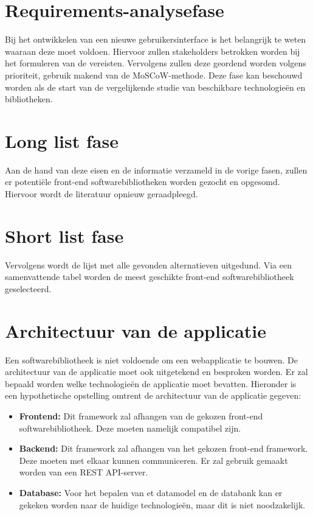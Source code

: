 \section{Requirements-analysefase}
Bij het ontwikkelen van een nieuwe gebruikersinterface is het belangrijk te weten waaraan deze moet voldoen. Hiervoor zullen stakeholders betrokken worden bij het formuleren van de vereisten. Vervolgens zullen deze geordend worden volgens prioriteit, gebruik makend van de MoSCoW-methode. Deze fase kan beschouwd worden als de start van de vergelijken\-de studie van beschikbare technologieën en bibliotheken.

\section {Long list fase}
Aan de hand van deze eisen en de informatie verzameld in de vorige fasen, zullen er potentiële front-end softwarebibliotheken worden gezocht en opgesomd. Hiervoor wordt de literatuur opnieuw geraadpleegd.

\section {Short list fase}
Vervolgens wordt de lijst met alle gevonden alternatieven uitgedund. Via een samenvattende tabel worden de meest geschikte front-end softwarebibliotheek geselecteerd.

\section{Architectuur van de applicatie}
Een softwarebibliotheek is niet voldoende om een webapplicatie te bouwen. De architectuur van de applicatie moet ook uitgetekend en besproken worden. Er zal bepaald worden welke technologieën de applicatie moet bevatten. Hieronder is een hypothetische opstelling omtrent de architectuur van de applicatie gegeven:

\begin{itemize} 
    \item \textbf{Frontend:} Dit framework zal afhangen van de gekozen front-end softwarebibliotheek. Deze moeten namelijk compatibel zijn.
    \item \textbf{Backend:} Dit framework zal afhangen van het gekozen front-end framework. Deze m\-oeten met elkaar kunnen communiceren. Er zal gebruik gemaakt worden van een REST API-server.
    \item \textbf{Database:} Voor het bepalen van et datamodel en de databank kan er gekeken worden naar de huidige technologieën, maar dit is niet noodzakelijk.
\end{itemize}


